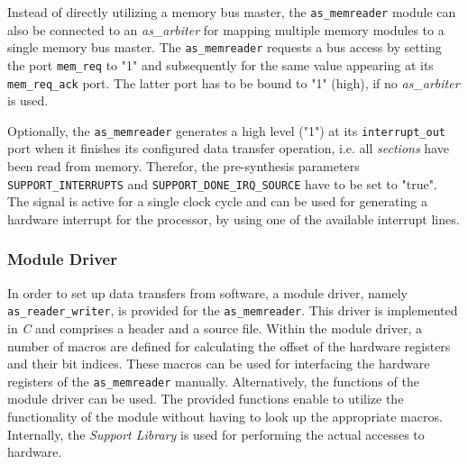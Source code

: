 Instead of directly utilizing a memory bus master, the \texttt{as\_memreader} module can also be connected to an \textit{as\_arbiter} for mapping multiple \asterics memory modules to a single memory bus master.
The \texttt{as\_memreader} requests a bus access by setting the port \texttt{mem\_req} to "1" and subsequently for the same value appearing at its \texttt{mem\_req\_ack} port.
The latter port has to be bound to "1" (high), if no \textit{as\_arbiter} is used.


Optionally, the \texttt{as\_memreader} generates a high level ("1") at its \texttt{interrupt\_out} port when it finishes its configured data transfer operation, i.e. all \textit{sections} have been read from memory.
Therefor, the pre-synthesis parameters \texttt{SUPPORT\_INTERRUPTS} and \texttt{SUPPORT\_DONE\_IRQ\_SOURCE} have to be set to "true".
The signal is active for a single clock cycle and can be used for generating a hardware interrupt for the processor, by using one of the available interrupt lines.


\subsubsection{Module Driver}
In order to set up data transfers from software, a module driver, namely \texttt{as\_reader\_writer}, is provided for the \texttt{as\_memreader}.
This driver is implemented in \textit{C} and comprises a header and a source file.
Within the module driver, a number of macros are defined for calculating the offset of the hardware registers and their bit indices.
These macros can be used for interfacing the hardware registers of the \texttt{as\_memreader} manually.
Alternatively, the functions of the module driver can be used. 
The provided functions enable to utilize the functionality of the module without having to look up the appropriate macros.
Internally, the \textit{\asterics Support Library} is used for performing the actual accesses to hardware.

